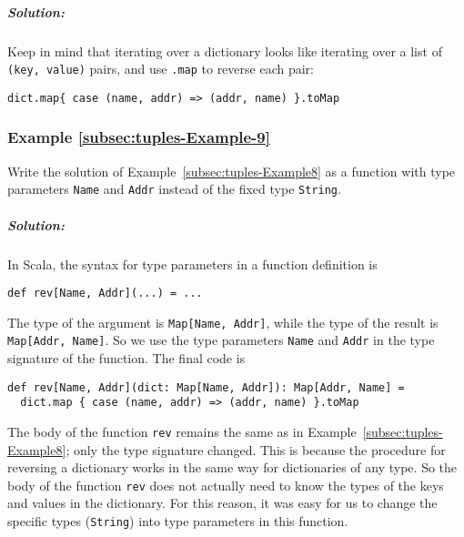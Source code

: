 \subparagraph{Solution:}

Keep in mind that iterating over a dictionary looks like iterating
over a list of \lstinline!(key, value)!
pairs, and use \lstinline!.map!
to reverse each pair:

\begin{lstlisting}
dict.map{ case (name, addr) => (addr, name) }.toMap
\end{lstlisting}

\subsubsection{Example \label{subsec:tuples-Example-9}\ref{subsec:tuples-Example-9}}

Write the solution of Example~\ref{subsec:tuples-Example8} as a
function with type parameters \lstinline!Name!
and \lstinline!Addr! instead
of the fixed type \lstinline!String!.

\subparagraph{Solution:}

In Scala, the syntax for type parameters in a function definition
is
\begin{lstlisting}
def rev[Name, Addr](...) = ...
\end{lstlisting}
The type of the argument is \lstinline!Map[Name, Addr]!,
while the type of the result is \lstinline!Map[Addr, Name]!.
So we use the type parameters \lstinline!Name!
and \lstinline!Addr! in
the type signature of the function. The final code is
\begin{lstlisting}
def rev[Name, Addr](dict: Map[Name, Addr]): Map[Addr, Name] =
  dict.map { case (name, addr) => (addr, name) }.toMap
\end{lstlisting}
The body of the function \lstinline!rev!
remains the same as in Example~\ref{subsec:tuples-Example8}; only
the type signature changed. This is because the procedure for reversing
a dictionary works in the same way for dictionaries of any type. So
the body of the function \lstinline!rev!
does not actually need to know the types of the keys and values in
the dictionary. For this reason, it was easy for us to change the
specific types (\lstinline!String!)
into type parameters in this function.

